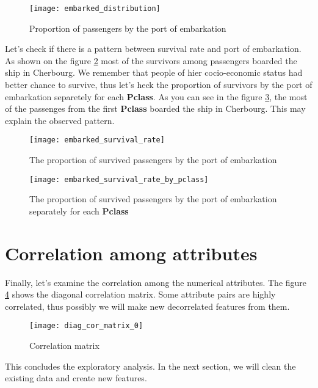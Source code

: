 \begin{figure}[!hp]
    \centering
    \texttt{[image: embarked\_distribution]}
    \caption{Proportion of passengers by the port of embarkation}
    \label{pic:embarked_distribution}
\end{figure}

Let's check if there is a pattern between survival rate and port of embarkation.
As shown on the figure \ref{pic:embarked_survival_rate} most of the survivors
among passengers boarded the ship in Cherbourg. We remember that people of 
hier cocio-economic status had better chance to survive, thus let's heck the
proportion of survivors by the port of embarkation separetely for each 
\textbf{Pclass}. As you can see in the figure 
\ref{pic:embarked_survival_rate_by_pclass}, the most of the passenges from 
the first \textbf{Pclass} boarded the ship in Cherbourg. This may explain the 
observed pattern.

\begin{figure}[!hp]
    \centering
    \texttt{[image: embarked\_survival\_rate]}
    \caption{The proportion of survived passengers by the port of embarkation}
    \label{pic:embarked_survival_rate}
\end{figure}

\begin{figure}[!hp]
    \centering
    \texttt{[image: embarked\_survival\_rate\_by\_pclass]}
    \caption{The proportion of survived passengers by the port of embarkation separately for each \textbf{Pclass}}
    \label{pic:embarked_survival_rate_by_pclass}
\end{figure}


\section{Correlation among attributes}
Finally, let's examine the correlation among the numerical attributes.
The figure \ref{pic:diag_cor_matrix_0} shows the diagonal correlation matrix.
Some attribute pairs are highly correlated, thus possibly we will make new 
decorrelated features from them.

\begin{figure}
    \centering
    \texttt{[image: diag\_cor\_matrix\_0]}
    \caption{Correlation matrix}
    \label{pic:diag_cor_matrix_0}
\end{figure}

This concludes the exploratory analysis. In the next section, we will clean 
the existing data and create new features.